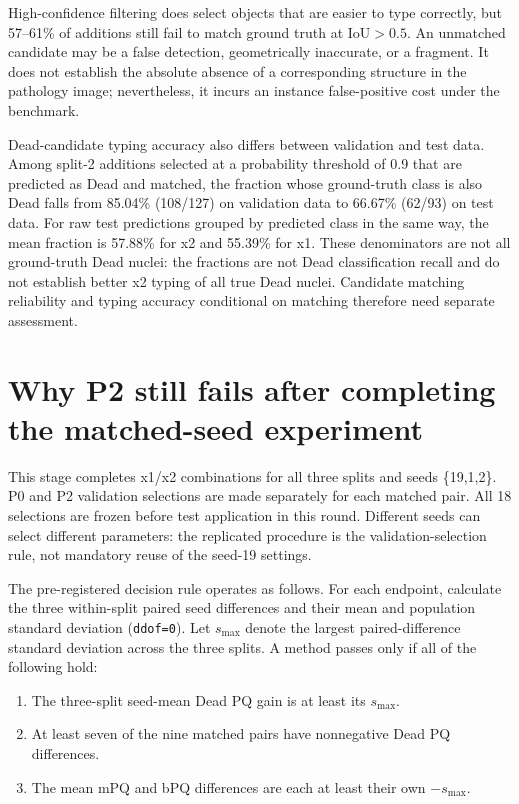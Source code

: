\documentclass[11pt,a4paper]{article}
\newcommand{\code}[1]{\nolinkurl{#1}}
\begin{document}
High-confidence filtering does select objects that are easier to type correctly, but 57--61\% of additions still fail to match ground truth at IoU$>0.5$. An unmatched candidate may be a false detection, geometrically inaccurate, or a fragment. It does not establish the absolute absence of a corresponding structure in the pathology image; nevertheless, it incurs an instance false-positive cost under the benchmark.

Dead-candidate typing accuracy also differs between validation and test data. Among split-2 additions selected at a probability threshold of 0.9 that are predicted as Dead and matched, the fraction whose ground-truth class is also Dead falls from 85.04\% (108/127) on validation data to 66.67\% (62/93) on test data. For raw test predictions grouped by predicted class in the same way, the mean fraction is 57.88\% for x2 and 55.39\% for x1. These denominators are not all ground-truth Dead nuclei: the fractions are not Dead classification recall and do not establish better x2 typing of all true Dead nuclei. Candidate matching reliability and typing accuracy conditional on matching therefore need separate assessment.

\section{Why P2 still fails after completing the matched-seed experiment}

This stage completes x1/x2 combinations for all three splits and seeds \{19,1,2\}. P0 and P2 validation selections are made separately for each matched pair. All 18 selections are frozen before test application in this round. Different seeds can select different parameters: the replicated procedure is the validation-selection rule, not mandatory reuse of the seed-19 settings\cite{matchedplan}.

The pre-registered decision rule operates as follows. For each endpoint, calculate the three within-split paired seed differences and their mean and population standard deviation (\code{ddof=0}). Let $s_{\max}$ denote the largest paired-difference standard deviation across the three splits. A method passes only if all of the following hold:
\begin{enumerate}
\item The three-split seed-mean Dead PQ gain is at least its $s_{\max}$.
\item At least seven of the nine matched pairs have nonnegative Dead PQ differences.
\item The mean mPQ and bPQ differences are each at least their own $-s_{\max}$.
\end{enumerate}
\end{document}
